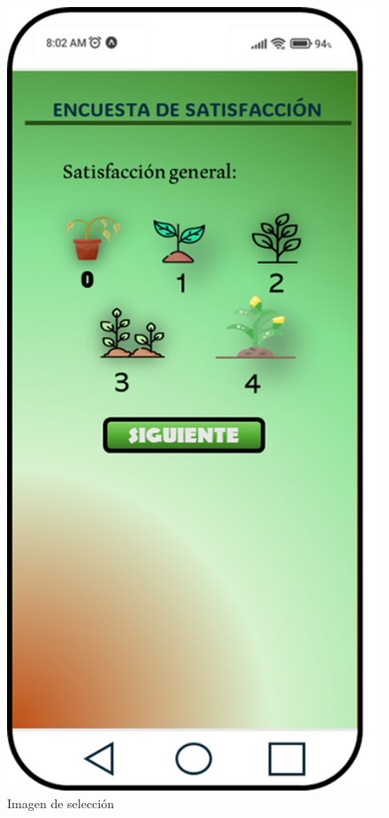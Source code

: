\documentclass[11pt, a4paper, oneside]{book}
\begin{document}
\begin{figure}[H]
\begin{minipage}{0.3\textwidth}
        \caption{Imagen de selección}
    \end{minipage}
    \hfill 
    \begin{minipage}{0.3\textwidth}
        \centering
        \includegraphics[width=\textwidth]{Pictures/Imagen 2.png}

\end{minipage}
\end{figure}
\end{document}
